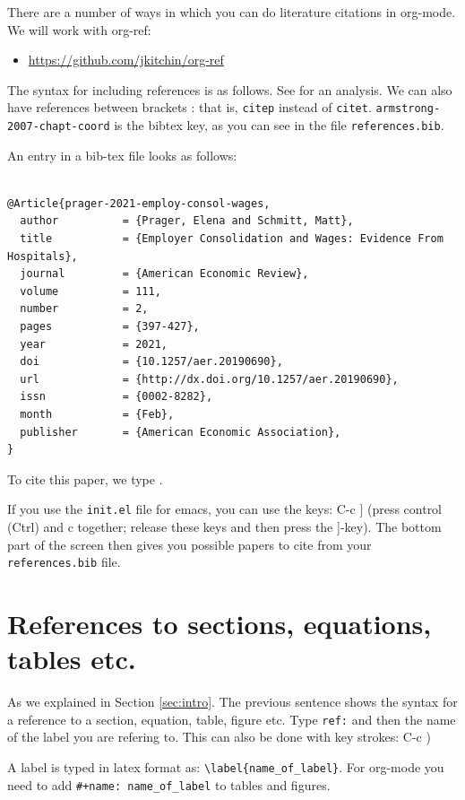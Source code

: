 \documentclass[11pt]{article}
\begin{document}
There are a number of ways in which you can do literature citations in org-mode. We will work with org-ref:
\begin{itemize}
\item \url{https://github.com/jkitchin/org-ref}
\end{itemize}

The syntax for including references is as follows. See \citet{armstrong-2007-chapt-coord} for an analysis. We can also have references between brackets \citep{athey-2019-machin-learn}: that is, \texttt{citep} instead of \texttt{citet}. \texttt{armstrong-2007-chapt-coord} is the bibtex key, as you can see in the file \texttt{references.bib}.

An entry in a bib-tex file looks as follows:

\begin{verbatim}

@Article{prager-2021-employ-consol-wages,
  author          = {Prager, Elena and Schmitt, Matt},
  title           = {Employer Consolidation and Wages: Evidence From Hospitals},
  journal         = {American Economic Review},
  volume          = 111,
  number          = 2,
  pages           = {397-427},
  year            = 2021,
  doi             = {10.1257/aer.20190690},
  url             = {http://dx.doi.org/10.1257/aer.20190690},
  issn            = {0002-8282},
  month           = {Feb},
  publisher       = {American Economic Association},
}
\end{verbatim}

To cite this paper, we type \cite{prager-2021-employ-consol-wages}.

If you use the \texttt{init.el} file for emacs, you can use the keys: C-c ] (press control (Ctrl) and c together; release these keys and then press the ]-key). The bottom part of the screen then gives you possible papers to cite from your \texttt{references.bib} file.


\section{References to sections, equations, tables etc.}

As we explained in Section \ref{sec:intro}. The previous sentence shows the syntax for a reference to a section, equation, table, figure etc. Type \texttt{ref:} and then the name of the label you are refering to. This can also be done with key strokes: C-c )

A label is typed in latex format as: \texttt{\textbackslash{}label\{name\_of\_label\}}. For org-mode you need to add \texttt{\#+name: name\_of\_label} to tables and figures.
\end{document}
